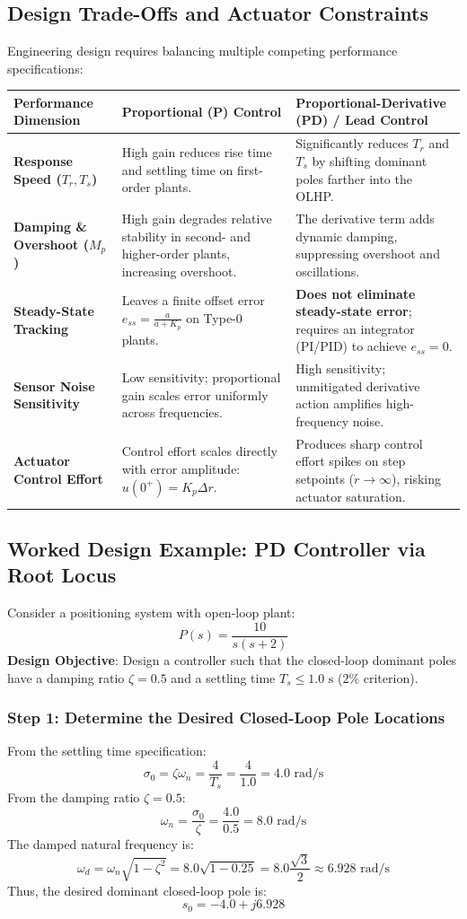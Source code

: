 \documentclass[12pt,onecolumn,twoside ]{article}
\begin{document}
	\subsection{Design Trade-Offs and Actuator Constraints}
	Engineering design requires balancing multiple competing performance specifications:
	\begin{center}\small\begin{tabularx}{\textwidth}{*{3}{Y}}
			\toprule
			\textbf{Performance Dimension} & \textbf{Proportional (P) Control} & \textbf{Proportional-Derivative (PD) / Lead Control} \\
			\midrule
			\textbf{Response Speed ($T_r, T_s$)} & High gain reduces rise time and settling time on first-order plants. & Significantly reduces $T_r$ and $T_s$ by shifting dominant poles farther into the OLHP. \\
			\textbf{Damping \& Overshoot ($M_p$)} & High gain degrades relative stability in second- and higher-order plants, increasing overshoot. & The derivative term adds dynamic damping, suppressing overshoot and oscillations. \\
			\textbf{Steady-State Tracking} & Leaves a finite offset error $e_{ss} = \frac{a}{a+K_p}$ on Type-0 plants. & \textbf{Does not eliminate steady-state error}; requires an integrator (PI/PID) to achieve $e_{ss} = 0$. \\
			\textbf{Sensor Noise Sensitivity} & Low sensitivity; proportional gain scales error uniformly across frequencies. & High sensitivity; unmitigated derivative action amplifies high-frequency noise. \\
			\textbf{Actuator Control Effort} & Control effort scales directly with error amplitude: $u(0^+) = K_p \Delta r$. & Produces sharp control effort spikes on step setpoints ($\dot{r} \to \infty$), risking actuator saturation. \\
			\bottomrule
	\end{tabularx}\end{center}
	
	\subsection{Worked Design Example: PD Controller via Root Locus}
	Consider a positioning system with open-loop plant: \[
	P(s) = \frac{10}{s(s + 2)}
	\] \textbf{Design Objective}: Design a controller such that the closed-loop dominant poles have a damping ratio $\zeta = 0.5$ and a settling time $T_s \le 1.0\text{ s}$ ($2\%$ criterion).
	\subsubsection{Step 1: Determine the Desired Closed-Loop Pole Locations}
	From the settling time specification: \[
	\sigma_0 = \zeta\omega_n = \frac{4}{T_s} = \frac{4}{1.0} = 4.0\text{ rad/s}
	\] From the damping ratio $\zeta = 0.5$: \[
	\omega_n = \frac{\sigma_0}{\zeta} = \frac{4.0}{0.5} = 8.0\text{ rad/s}
	\] The damped natural frequency is: \[
	\omega_d = \omega_n \sqrt{1 - \zeta^2} = 8.0 \sqrt{1 - 0.25} = 8.0 \frac{\sqrt{3}}{2} \approx 6.928\text{ rad/s}
	\] Thus, the desired dominant closed-loop pole is: \[
	s_0 = -4.0 + j6.928
	\]
\end{document}
